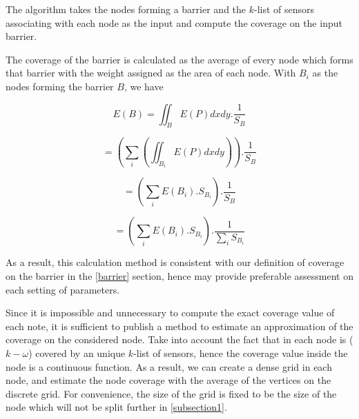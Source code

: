The algorithm takes the nodes forming a barrier and the $k$-list of sensors associating with each node as the input and compute the coverage on the input barrier.

The coverage of the barrier is calculated as the average of every node which forms that barrier with the weight assigned as the area of each node. With $B_i$ as the nodes forming the barrier $B$, we have

$$E(B) = \iint_{B}E(P)dxdy.\frac{1}{S_B}$$

$$= (\sum_i(\iint_{B_i}E(P)dxdy)).\frac{1}{S_B}$$

$$=(\sum_iE(B_i).S_{B_i}).\frac{1}{S_B} $$

$$=(\sum_iE(B_i).S_{B_i}).\frac{1}{\sum_iS_{B_i}}$$

As a result, this calculation method is consistent with our definition of coverage on the barrier in the \ref{barrier} section, hence may provide preferable assessment on each setting of parameters.

Since it is impossible and unnecessary to compute the exact coverage value of each note, it is sufficient to publish a method to estimate an approximation of the coverage on the considered node. Take into account the fact that in each node is ($k-\omega$) covered by an unique $k$-list of sensors, hence the coverage value inside the node is a continuous function. As a result, we can create a dense grid in each node, and estimate the node coverage with the average of the vertices on the discrete grid. For convenience, the size of the grid is fixed to be the size of the node which will not be split further in \ref{subsection1}.
